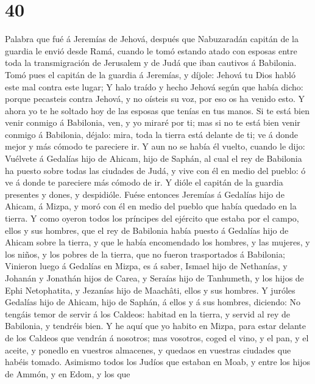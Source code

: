 \hypertarget{section-39}{%
\section{40}\label{section-39}}

 Palabra que fué á Jeremías de Jehová, después que
Nabuzaradán capitán de la guardia le envió desde Ramá, cuando le tomó
estando atado con esposas entre toda la transmigración de Jerusalem y de
Judá que iban cautivos á Babilonia.  Tomó pues el capitán de
la guardia á Jeremías, y díjole: Jehová tu Dios habló este mal contra
este lugar;  Y halo traído y hecho Jehová según que había
dicho: porque pecasteis contra Jehová, y no oísteis su voz, por eso os
ha venido esto.  Y ahora yo te he soltado hoy de las esposas
que tenías en tus manos. Si te está bien venir conmigo á Babilonia, ven,
y yo miraré por ti; mas si no te está bien venir conmigo á Babilonia,
déjalo: mira, toda la tierra está delante de ti; ve á donde mejor y más
cómodo te pareciere ir.  Y aun no se había él vuelto, cuando
le dijo: Vuélvete á Gedalías hijo de Ahicam, hijo de Saphán, al cual el
rey de Babilonia ha puesto sobre todas las ciudades de Judá, y vive con
él en medio del pueblo: ó ve á donde te pareciere más cómodo de ir. Y
dióle el capitán de la guardia presentes y dones, y despidióle.
 Fuése entonces Jeremías á Gedalías hijo de Ahicam, á Mizpa,
y moró con él en medio del pueblo que había quedado en la tierra.
 Y como oyeron todos los príncipes del ejército que estaba
por el campo, ellos y sus hombres, que el rey de Babilonia había puesto
á Gedalías hijo de Ahicam sobre la tierra, y que le había encomendado
los hombres, y las mujeres, y los niños, y los pobres de la tierra, que
no fueron trasportados á Babilonia;  Vinieron luego á
Gedalías en Mizpa, es á saber, Ismael hijo de Nethanías, y Johanán y
Jonathán hijos de Carea, y Seraías hijo de Tanhumeth, y los hijos de
Ephi Netophatita, y Jezanías hijo de Maachâti, ellos y sus hombres.
 Y juróles Gedalías hijo de Ahicam, hijo de Saphán, á ellos
y á sus hombres, diciendo: No tengáis temor de servir á los Caldeos:
habitad en la tierra, y servid al rey de Babilonia, y tendréis bien.
 Y he aquí que yo habito en Mizpa, para estar delante de
los Caldeos que vendrán á nosotros; mas vosotros, coged el vino, y el
pan, y el aceite, y ponedlo en vuestros almacenes, y quedaos en vuestras
ciudades que habéis tomado.  Asimismo todos los Judíos que
estaban en Moab, y entre los hijos de Ammón, y en Edom, y los que
